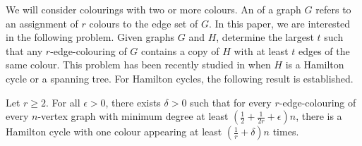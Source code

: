 \documentclass[10pt,a4paper,reqno]{amsart}
\begin{document}
We will consider colourings with two or more colours. An  of a graph $G$ refers to an assignment of $r$ colours to the edge set of $G$.
In this paper, we are interested in the following problem. Given graphs $G$ and $H$, determine the largest $t$ such that any $r$-edge-colouring of $G$ contains a copy of $H$ with at least $t$ edges of the same colour. This problem has been recently studied in \cite{Balogh2020on,Freschi2021a,Gishboliner2022discrepancies} when $H$ is a Hamilton cycle or a spanning tree. For Hamilton cycles, the following result is established.
\begin{theorem} \label{thm:colour biased Ham cycle with min degree condition}
    Let $r\ge 2$.
    For all $\epsilon >0$, there exists $\delta >0$ such that for every $r$-edge-colouring of every $n$-vertex graph with minimum degree at least $\left(\frac{1}{2} + \frac{1}{2r} + \epsilon\right)n$, there is a Hamilton cycle with one colour appearing at least $\left(\frac{1}{r} + \delta\right)n$ times. 
\end{theorem} 
\end{document}
